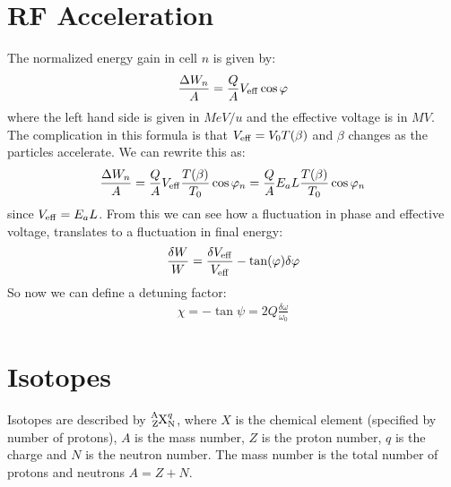 \documentclass{article}
\numberwithin{equation}{section}
\begin{document}
\section{RF Acceleration}
The normalized energy gain in cell $n$ is given by:
\begin{align}
\frac{\Delta W_n}{A} = \frac{Q}{A} V_{\rm eff} \cos \varphi
\end{align}
where the left hand side is given in $\si{MeV/u}$ and the effective voltage is in $\si{MV}$. The complication in this formula is that $V_{\rm eff} = V_0 T(\beta)$ and $\beta$ changes as the particles accelerate. We can rewrite this as:
\begin{align}
\frac{\Delta W_n}{A} = \frac{Q}{A} V_{\rm eff} \frac{T(\beta)}{T_0} \cos \varphi_n = \frac{Q}{A} E_a L \frac{T(\beta)}{T_0} \cos \varphi_n
\end{align}
since $V_{\rm eff} = E_a L$. From this we can see how a fluctuation in phase and effective voltage, translates to a fluctuation in final energy:
\begin{align}
\frac{\delta W}{W} = \frac{\delta V_{\rm eff}}{V_{\rm eff}} - \tan (\varphi) \delta \varphi
\end{align}
So now we can define a detuning factor:
\begin{align}
\chi = -\tan \psi = 2 Q \frac{\delta \omega}{\omega_0}
\end{align}


\section{Isotopes}
Isotopes are described by $\ce{^{A}_{Z}X^q_N}$, where $X$ is the chemical element (specified by number of protons), $A$ is the mass number, $Z$ is the proton number, $q$ is the charge and $N$ is the neutron number. The mass number is the total number of protons and neutrons $A = Z+N$.
\end{document}
